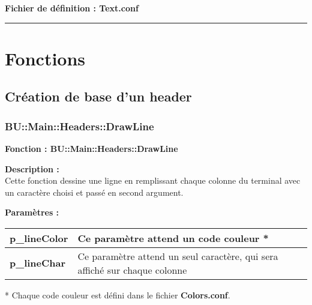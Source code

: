 \documentclass[a4paper,10pt]{article}
\begin{document}
\textbf{Fichier de définition : \color{lime}Text.conf}\\[1\baselineskip]





\color{red}\par\noindent\rule{\textwidth}{0.4pt}\color{white}

\color{red}
\section{Fonctions}\color{white}

\color{green}
\subsection{Création de base d'un header}\color{white}

\color{blue}
\subsubsection{BU::Main::Headers::DrawLine}\color{white}

\textbf{Fonction : \color{mauve}BU::Main::Headers::DrawLine}\\[1\baselineskip]

\begin{justify}
    \textbf{Description :}\\
    Cette fonction dessine une ligne en remplissant chaque colonne du terminal avec un caractère choisi et passé en second argument.
\end{justify}

\textbf{Paramètres :}\\[1\baselineskip]
\begin{tabular}{|l|l|}
\hline
\textbf{\color{orange}p\_lineColor} & Ce paramètre attend un code couleur * \\
\hline
\textbf{\color{orange}p\_lineChar} & Ce paramètre attend un seul caractère, qui sera affiché sur chaque colonne \\
\hline
\end{tabular}


\begin{justify}
    * Chaque code couleur est défini dans le fichier \textbf{\color{lime}Colors.conf}.
\end{justify}
\end{document}
